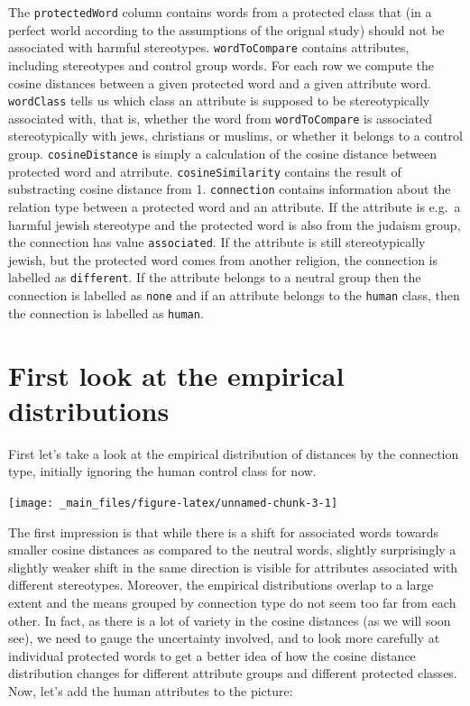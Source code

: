 \documentclass[
  12pt,
]{book}
\begin{document}
The \texttt{protectedWord} column contains words from a protected class that (in a perfect world according to the assumptions of the orignal study) should not be associated with harmful stereotypes. \texttt{wordToCompare} contains attributes, including stereotypes and control group words. For each row we compute the cosine distances between a given protected word and a given attribute word. \texttt{wordClass} tells us which class an attribute is supposed to be stereotypically associated with, that is, whether the word from \texttt{wordToCompare} is associated stereotypically with jews, christians or muslims, or whether it belongs to a control group. \texttt{cosineDistance} is simply a calculation of the cosine distance between protected word and atrribute. \texttt{cosineSimilarity} contains the result of substracting cosine distance from 1. \texttt{connection} contains information about the relation type between a protected word and an attribute. If the attribute is e.g.~a harmful jewish stereotype and the protected word is also from the judaism group, the connection has value \texttt{associated}. If the attribute is still stereotypically jewish, but the protected word comes from another religion, the connection is labelled as \texttt{different}. If the attribute belongs to a neutral group then the connection is labelled as \texttt{none} and if an attribute belongs to the \texttt{human} class, then the connection is labelled as \texttt{human}.

\hypertarget{first-look-at-the-empirical-distributions}{%
\section{First look at the empirical distributions}\label{first-look-at-the-empirical-distributions}}

First let's take a look at the empirical distribution of distances by the connection type, initially ignoring the human control class for now.

\vspace{1mm}
\footnotesize

\begin{center}\texttt{[image: \_main\_files/figure-latex/unnamed-chunk-3-1]} \end{center}
\normalsize

The first impression is that while there is a shift for associated words towards smaller cosine distances as compared to the neutral words, slightly surprisingly a slightly weaker shift in the same direction is visible for attributes associated with different stereotypes. Moreover, the empirical distributions overlap to a large extent and the means grouped by connection type do not seem too far from each other. In fact, as there is a lot of variety in the cosine distances (as we will soon see), we need to gauge the uncertainty involved, and to look more carefully at individual protected words to get a better idea of how the cosine distance distribution changes for different attribute groups and different protected classes. Now, let's add the human attributes to the picture:
\end{document}
